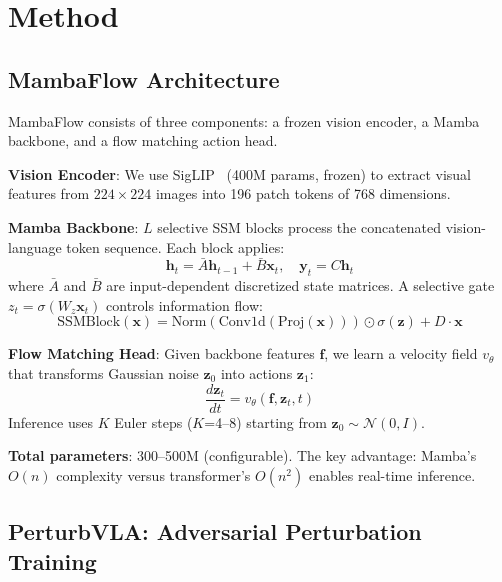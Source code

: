 \documentclass[11pt]{article}
\begin{document}
\section{Method}

\subsection{MambaFlow Architecture}
\label{sec:mambaflow}

MambaFlow consists of three components: a frozen vision encoder, a Mamba backbone, and a flow matching action head.

\textbf{Vision Encoder}: We use SigLIP~\cite{siglip2023} (400M params, frozen) to extract visual features from $224\times224$ images into 196 patch tokens of 768 dimensions.

\textbf{Mamba Backbone}: $L$ selective SSM blocks process the concatenated vision-language token sequence. Each block applies:
\begin{equation}
    \mathbf{h}_t = \bar{A}\mathbf{h}_{t-1} + \bar{B}\mathbf{x}_t, \quad \mathbf{y}_t = C\mathbf{h}_t
\end{equation}
where $\bar{A}$ and $\bar{B}$ are input-dependent discretized state matrices. A selective gate $z_t = \sigma(W_z \mathbf{x}_t)$ controls information flow:
\begin{equation}
    \text{SSMBlock}(\mathbf{x}) = \text{Norm}(\text{Conv1d}(\text{Proj}(\mathbf{x}))) \odot \sigma(\mathbf{z}) + D \cdot \mathbf{x}
\end{equation}

\textbf{Flow Matching Head}: Given backbone features $\mathbf{f}$, we learn a velocity field $v_\theta$ that transforms Gaussian noise $\mathbf{z}_0$ into actions $\mathbf{z}_1$:
\begin{equation}
    \frac{d\mathbf{z}_t}{dt} = v_\theta(\mathbf{f}, \mathbf{z}_t, t)
\end{equation}
Inference uses $K$ Euler steps ($K$=4--8) starting from $\mathbf{z}_0 \sim \mathcal{N}(0, I)$.

\textbf{Total parameters}: 300--500M (configurable). The key advantage: Mamba's $O(n)$ complexity versus transformer's $O(n^2)$ enables real-time inference.

\subsection{PerturbVLA: Adversarial Perturbation Training}
\label{sec:perturbvla}
\end{document}
